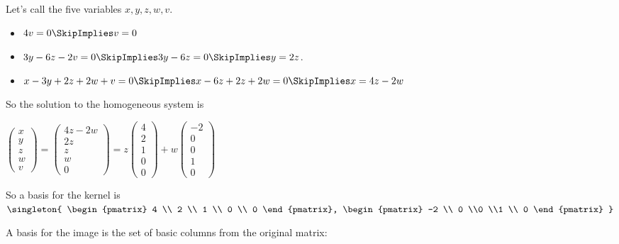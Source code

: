 \documentclass[oneside,12pt]{amsart}
\begin{document}
Let's call the five variables $x,y,z,w,v$.

\begin{itemize}
\item $4v=0 \SkipImplies v=0$
\item $3y -6z -2v = 0 \SkipImplies 3y -6z = 0 \SkipImplies y=2z$.
\item $x - 3y +2z +2w +v = 0 \SkipImplies x -6z +2z +2w = 0 \SkipImplies x = 4z - 2w$
\end{itemize}


So the solution to the homogeneous system is

$
\begin{pmatrix}
x \\
y \\
z \\
w \\
v
\end{pmatrix}
=
\begin{pmatrix}
4z-2w\\
2z\\
z \\
w \\
0
\end{pmatrix}
=
z
\begin{pmatrix}
4 \\ 2 \\ 1 \\ 0 \\ 0
\end{pmatrix}
+
w
\begin{pmatrix}
-2 \\ 0 \\0 \\1 \\ 0
\end{pmatrix}
$

So a basis for the kernel is
$\singleton{
\begin{pmatrix}
4 \\ 2 \\ 1 \\ 0 \\ 0
\end{pmatrix},
\begin{pmatrix}
-2 \\ 0 \\0 \\1 \\ 0
\end{pmatrix}
}$

A basis for the image is the set of basic columns from the original matrix:
\end{document}
